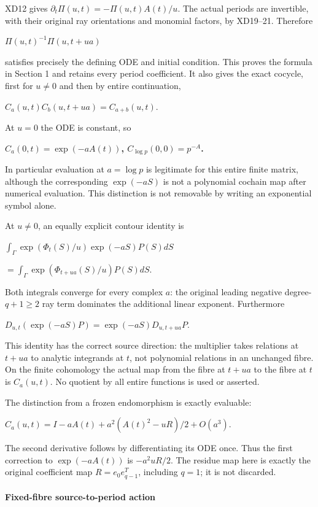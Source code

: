 XD12 gives \(\partial_t \Pi(u,t)=-\Pi(u,t)A(t)/u\). The actual periods are invertible, with their original ray orientations and monomial factors, by XD19--21. Therefore

\(\Pi(u,t)^{-1}\Pi(u,t+ua)\)

satisfies precisely the defining ODE and initial condition. This proves the formula in Section 1 and retains every period coefficient. It also gives the exact cocycle, first for \(u\ne 0\) and then by entire continuation,

\(C_a(u,t) C_b(u,t+ua)=C_{a+b}(u,t)\).

At \(u=0\) the ODE is constant, so

\textbf{\(C_a(0,t)=\exp(-a A(t))\), \(C_{\log p}(0,0)=p^{-A}\).}

In particular evaluation at \(a=\log p\) is legitimate for this entire finite matrix, although the corresponding \(\exp(-aS)\) is not a polynomial cochain map after numerical evaluation. This distinction is not removable by writing an exponential symbol alone.

At \(u\ne 0\), an equally explicit contour identity is

\(\int_\Gamma \exp(\Phi_t(S)/u) \exp(-aS) P(S)dS\)

\(=\int_\Gamma \exp(\Phi_{t+ua}(S)/u) P(S)dS\).

Both integrals converge for every complex \(a\): the original leading negative degree-\(q+1\ge 2\) ray term dominates the additional linear exponent. Furthermore

\(D_{u,t}(\exp(-aS)P)=\exp(-aS)D_{u,t+ua}P\).

This identity has the correct source direction: the multiplier takes relations at \(t+ua\) to analytic integrands at \(t\), not polynomial relations in an unchanged fibre. On the finite cohomology the actual map from the fibre at \(t+ua\) to the fibre at \(t\) is \(C_a(u,t)\). No quotient by all entire functions is used or asserted.

The distinction from a frozen endomorphism is exactly evaluable:

\(C_a(u,t)=I-aA(t)+a^2(A(t)^2-uR)/2+O(a^3)\).

The second derivative follows by differentiating its ODE once. Thus the first correction to \(\exp(-aA(t))\) is \(-a^2uR/2\). The residue map here is exactly the original coefficient map \(R=e_0 e_{q-1}^T\), including \(q=1\); it is not discarded.

\paragraph{Fixed-fibre source-to-period action}\label{endpoint-f1_scaling--fixed-fibre-source-to-period-action}

